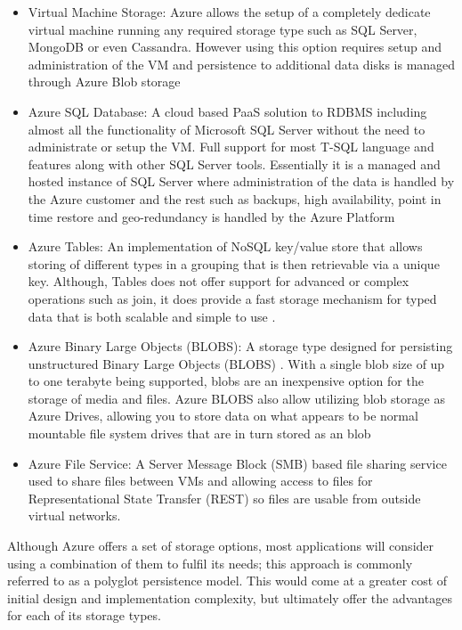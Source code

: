 \begin{itemize}
\item Virtual Machine Storage: Azure allows the setup of a completely dedicate virtual machine running any required storage type such as SQL Server, MongoDB or even Cassandra. However using this option requires setup and administration of the VM and persistence to additional data disks is managed through Azure Blob storage
\item Azure SQL Database: A cloud based PaaS solution to RDBMS including almost all the functionality of Microsoft SQL Server without the need to administrate or setup the VM.  Full support for most T-SQL language and features along with other SQL Server tools. Essentially it is a managed and hosted instance of SQL Server where administration of the data is handled by the Azure customer and the rest such as backups, high availability, point in time restore and geo-redundancy is handled by the Azure Platform \cite{Microsoft_Corporation_undated-ej}
\item Azure Tables: An implementation of NoSQL key/value store that allows storing of different types in a grouping that is then retrievable via a unique key. Although, Tables does not offer support for advanced or complex operations such as join, it does provide a fast storage mechanism for typed data that is both scalable and simple to use \cite{Microsoft_Corporation_undated-ej}.
\item Azure Binary Large Objects (BLOBS): A storage type designed for persisting unstructured Binary Large Objects (BLOBS) \cite{Microsoft_Corporation_undated-ej}. With a single blob size of up to one terabyte being supported, blobs are an inexpensive option for the storage of media and files. Azure BLOBS also allow utilizing blob storage as Azure Drives, allowing you to store data on what appears to be normal mountable file system drives that are in turn stored as an blob
\item Azure File Service: A Server Message Block (SMB) based file sharing service used to share files between VMs and allowing access to files for Representational State Transfer (REST) so files are usable from outside virtual networks.
\end{itemize}


Although Azure offers a set of storage options, most applications will consider using a combination of them to fulfil its needs; this approach is commonly referred to as a polyglot persistence model. This would come at a greater cost of initial design and implementation complexity, but ultimately offer the advantages for each of its storage types.
 
